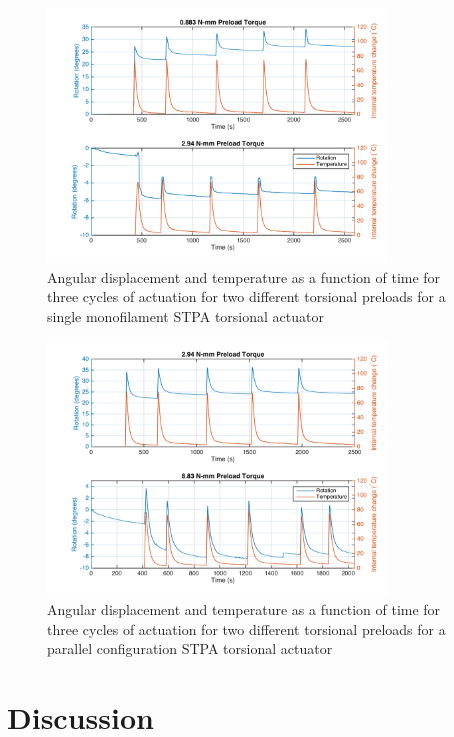 \documentclass[twocolumn,10pt]{asme2e}
\begin{document}
\begin{figure}
    \centering
        \includegraphics[width=9cm,clip = true, trim = {1cm, 0 ,0 ,0 }]{../Images/TIMEPLOT_030100M.png}
        \caption{Angular displacement and temperature as a function of time for three cycles of actuation for two different torsional preloads for a single monofilament STPA torsional actuator}
        \label{fig:time_hist_m}
\end{figure}
\begin{figure}
    \centering
        \includegraphics[width=9cm,clip = true, trim = {1cm, 0 ,0 ,0 }]{../Images/TIMEPLOT_100300P.png}
        \caption{Angular displacement and temperature as a function of time for three cycles of actuation for two different torsional preloads for a parallel configuration STPA torsional actuator }
        \label{fig:time_hist_p}
\end{figure}



\section{Discussion}
\end{document}
